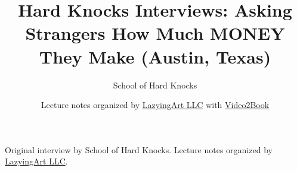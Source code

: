 \documentclass[11pt,oneside]{book}
\begin{document}
\frontmatter
\title{Hard Knocks Interviews: Asking Strangers How Much MONEY They Make (Austin, Texas)}
\author{School of Hard Knocks}
\date{Lecture notes organized by \href{https://lazying.art}{LazyingArt LLC} with \href{https://github.com/lachlanchen/Video2Book}{Video2Book}}
\maketitle
\begin{center}
\small Original interview by School of Hard Knocks. Lecture notes organized by \href{https://lazying.art}{LazyingArt LLC}.
\end{center}
\clearpage
\mainmatter

\end{document}
